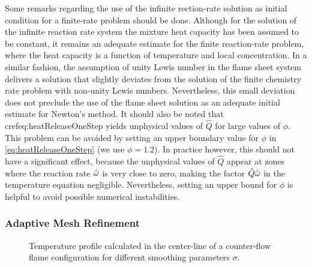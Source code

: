 Some remarks regarding the use of the infinite rection-rate solution as initial condition for a finite-rate problem should be done. Although for the solution of the infinite reaction rate system the mixture heat capacity has been assumed to be constant, it remains an adequate estimate for the finite reaction-rate problem, where the heat capacity is a function of temperature and local concentration. In a similar fashion, the assumption of unity Lewis number in the flame sheet system delivers a solution that slightly deviates from the solution of the finite chemistry rate problem with non-unity Lewis numbers. Nevertheless, this small deviation does not preclude the use of the flame sheet solution as an adequate initial estimate for Newton's method.
It should also be noted that cref{eq:heatReleaseOneStep} yields unphysical values of $\hat Q$ for large values of $\phi$. This problem can be avoided by setting an upper boundary value for $\phi$ in \cref{eq:heatReleaseOneStep} (we use $\phi = 1.2$). In practice however, this should not have a significant effect, because the unphysical values of $\hat Q$ appear at zones where the reaction rate $\hat{\omega}$ is very close to zero, making the factor $\hat Q \hat{\omega}$ in the temperature equation negligible. Nevertheless, setting an upper bound for $\phi$ is helpful to avoid possible numerical instabilities.

\subsubsection{Adaptive Mesh Refinement}

\begin{figure}
	\centering
	\caption{Temperature profile calculated in the center-line of a counter-flow flame configuration for different smoothing parameters $\sigma$.}
	\label{fig:smoothings}
\end{figure}
